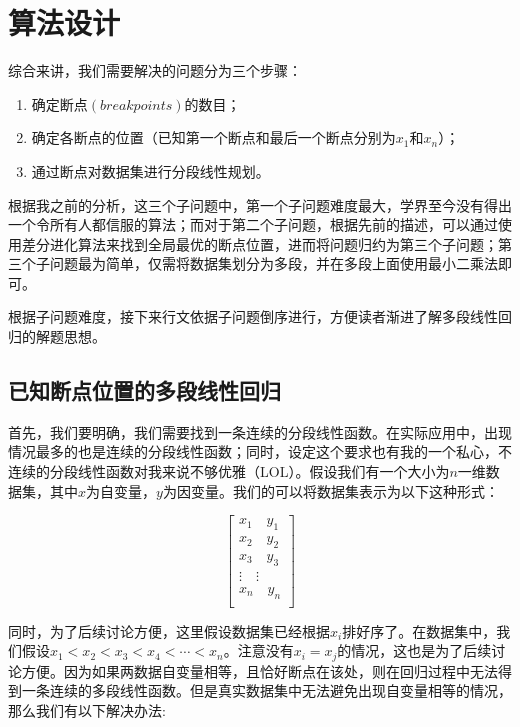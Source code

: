 
\section{算法设计}

综合来讲，我们需要解决的问题分为三个步骤：

\begin{enumerate}[\quad ·]
    \item 确定断点$(breakpoints)$的数目；
    \item 确定各断点的位置（已知第一个断点和最后一个断点分别为$x_1$和$x_n$）；
    \item 通过断点对数据集进行分段线性规划。
\end{enumerate}

根据我之前的分析，这三个子问题中，第一个子问题难度最大，学界至今没有得出一个令所有人都信服的算法；而对于第二个子问题，根据先前的描述，可以通过使用差分进化算法来找到全局最优的断点位置，进而将问题归约为第三个子问题；第三个子问题最为简单，仅需将数据集划分为多段，并在多段上面使用最小二乘法即可。

根据子问题难度，接下来行文依据子问题倒序进行，方便读者渐进了解多段线性回归的解题思想。

\subsection{已知断点位置的多段线性回归 \label{p1}}

首先，我们要明确，我们需要找到一条连续的分段线性函数。在实际应用中，出现情况最多的也是连续的分段线性函数；同时，设定这个要求也有我的一个私心，不连续的分段线性函数对我来说不够优雅（LOL）。假设我们有一个大小为$n$一维数据集，其中$x$为自变量，$y$为因变量。我们的可以将数据集表示为以下这种形式：

\[\begin{bmatrix}
    x_1 \quad y_1 \\
    x_2 \quad y_2 \\
    x_3 \quad y_3 \\
    \vdots \quad \vdots \\
    x_n \quad y_n \\
    \end{bmatrix}\]

同时，为了后续讨论方便，这里假设数据集已经根据$x_i$排好序了。在数据集中，我们假设$x_1 < x_2 < x_3 < x_4 < \cdots < x_n$。注意没有$x_i = x_j$的情况，这也是为了后续讨论方便。因为如果两数据自变量相等，且恰好断点在该处，则在回归过程中无法得到一条连续的多段线性函数。但是真实数据集中无法避免出现自变量相等的情况，那么我们有以下解决办法:

